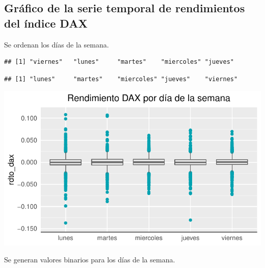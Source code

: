 \documentclass[
  11pt,
]{article}
\newenvironment{Shaded}{\begin{snugshade}}{\end{snugshade}}
\newcommand{\CommentTok}[1]{\textcolor[rgb]{0.56,0.35,0.01}{\textit{#1}}}
\newcommand{\DataTypeTok}[1]{\textcolor[rgb]{0.13,0.29,0.53}{#1}}
\newcommand{\DecValTok}[1]{\textcolor[rgb]{0.00,0.00,0.81}{#1}}
\newcommand{\KeywordTok}[1]{\textcolor[rgb]{0.13,0.29,0.53}{\textbf{#1}}}
\newcommand{\NormalTok}[1]{#1}
\newcommand{\OperatorTok}[1]{\textcolor[rgb]{0.81,0.36,0.00}{\textbf{#1}}}
\newcommand{\StringTok}[1]{\textcolor[rgb]{0.31,0.60,0.02}{#1}}
\begin{document}
\hypertarget{gruxe1fico-de-la-serie-temporal-de-rendimientos-del-uxedndice-dax}{%
\subsection{Gráfico de la serie temporal de rendimientos del índice
DAX}\label{gruxe1fico-de-la-serie-temporal-de-rendimientos-del-uxedndice-dax}}

\hypertarget{htmlwidget-683dc24e847baa9d2feb}{}

Se ordenan los días de la semana.

\begin{verbatim}
## [1] "viernes"   "lunes"     "martes"    "miercoles" "jueves"
\end{verbatim}

\begin{verbatim}
## [1] "lunes"     "martes"    "miercoles" "jueves"    "viernes"
\end{verbatim}

\begin{center}\includegraphics[width=0.9\linewidth]{RmdFigs/boxplot-dax-1} \end{center}

Se generan valores binarios para los días de la semana.

\begin{Shaded}
\end{Shaded}
\end{document}
